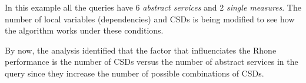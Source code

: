 In this example all the queries have 6 \textit{abstract services} and 2
\textit{single measures}. The number of local variables (dependencies) and CSDs
is being modified to see how the algorithm works under these conditions.   

By now, the analysis identified that the factor that influenciates the Rhone
performance is the number of CSDs versus the number of abstract services in the
query since they increase the number of possible combinations of CSDs.   



